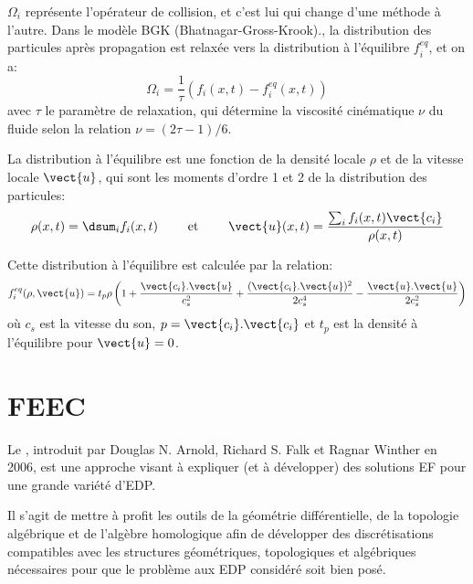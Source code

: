 $\Omega_i$ représente l'opérateur de collision, et c'est lui qui change d'une méthode à l'autre.
Dans le modèle BGK (Bhatnagar-Gross-Krook).,
la distribution des particules après propagation est relaxée vers la distribution à l'équilibre $f_i^{eq}$,
et on a:
\begin{equation} \Omega_i = \frac1{\tau}\left(f_i(x,t)-f_i^{eq}(x,t)\right) \end{equation}
avec $\tau$ le paramètre de relaxation, qui détermine la viscosité cinématique $\nu$ du
fluide selon la relation $\nu=(2\tau -1)/6$.

La distribution à l'équilibre est une fonction de la densité locale $\rho$ et de la vitesse locale $\vect{u}$,
qui sont les moments d'ordre 1 et 2 de la distribution des particules:
\begin{equation} \rho(x,t) = \dsum_i f_i(x,t) \qquad\text{ et }\qquad \vect{u}(x,t)=\dfrac{\sum_i f_i(x,t)\vect{c_i}}{\rho(x,t)} \end{equation}

Cette distribution à l'équilibre est calculée par la relation:
\begin{equation} f_i^{eq}(\rho,\vect{u}) =  t_p \rho \left(1+\dfrac{\vect{c_i}.\vect{u}}{c_s^2} + 
\dfrac{(\vect{c_i}.\vect{u})^2}{2c_s^4} - \dfrac{\vect{u}.\vect{u}}{2c_s^2}\right) \end{equation}
où $c_s$ est la vitesse du son, $p=\vect{c_i}.\vect{c_i}$ et $t_p$ est la densité à l'équilibre
pour $\vect{u}=0$.






\medskip{}
\section{FEEC}

Le , introduit par Douglas N. Arnold, 
Richard S. Falk et Ragnar Winther 
en 2006, est une approche visant à expliquer (et à développer) 
des solutions EF pour une grande variété d'EDP.

Il s'agit de mettre à profit les outils de la géométrie différentielle, de la topologie 
algébrique et de l'algèbre homologique afin de développer des discrétisations compatibles 
avec les structures géométriques, topologiques et algébriques nécessaires pour que le
problème aux EDP considéré soit bien posé.

